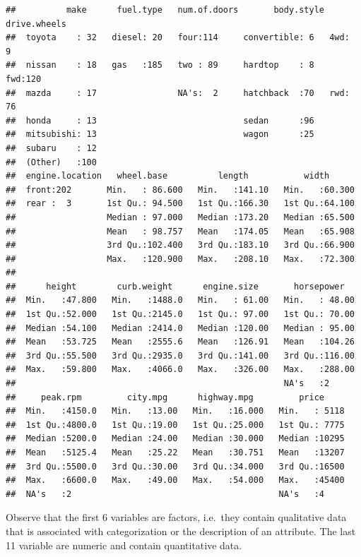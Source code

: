 \documentclass[]{krantz}
\theoremstyle{definition}
\theoremstyle{definition}
\theoremstyle{definition}
\theoremstyle{remark}
\begin{document}
\begin{verbatim}
##          make      fuel.type   num.of.doors       body.style drive.wheels
##  toyota    : 32   diesel: 20   four:114     convertible: 6   4wd:  9     
##  nissan    : 18   gas   :185   two : 89     hardtop    : 8   fwd:120     
##  mazda     : 17                NA's:  2     hatchback  :70   rwd: 76     
##  honda     : 13                             sedan      :96               
##  mitsubishi: 13                             wagon      :25               
##  subaru    : 12                                                          
##  (Other)   :100                                                          
##  engine.location   wheel.base          length           width       
##  front:202       Min.   : 86.600   Min.   :141.10   Min.   :60.300  
##  rear :  3       1st Qu.: 94.500   1st Qu.:166.30   1st Qu.:64.100  
##                  Median : 97.000   Median :173.20   Median :65.500  
##                  Mean   : 98.757   Mean   :174.05   Mean   :65.908  
##                  3rd Qu.:102.400   3rd Qu.:183.10   3rd Qu.:66.900  
##                  Max.   :120.900   Max.   :208.10   Max.   :72.300  
##                                                                     
##      height        curb.weight      engine.size       horsepower    
##  Min.   :47.800   Min.   :1488.0   Min.   : 61.00   Min.   : 48.00  
##  1st Qu.:52.000   1st Qu.:2145.0   1st Qu.: 97.00   1st Qu.: 70.00  
##  Median :54.100   Median :2414.0   Median :120.00   Median : 95.00  
##  Mean   :53.725   Mean   :2555.6   Mean   :126.91   Mean   :104.26  
##  3rd Qu.:55.500   3rd Qu.:2935.0   3rd Qu.:141.00   3rd Qu.:116.00  
##  Max.   :59.800   Max.   :4066.0   Max.   :326.00   Max.   :288.00  
##                                                     NA's   :2       
##     peak.rpm         city.mpg      highway.mpg         price      
##  Min.   :4150.0   Min.   :13.00   Min.   :16.000   Min.   : 5118  
##  1st Qu.:4800.0   1st Qu.:19.00   1st Qu.:25.000   1st Qu.: 7775  
##  Median :5200.0   Median :24.00   Median :30.000   Median :10295  
##  Mean   :5125.4   Mean   :25.22   Mean   :30.751   Mean   :13207  
##  3rd Qu.:5500.0   3rd Qu.:30.00   3rd Qu.:34.000   3rd Qu.:16500  
##  Max.   :6600.0   Max.   :49.00   Max.   :54.000   Max.   :45400  
##  NA's   :2                                         NA's   :4
\end{verbatim}

Observe that the first 6 variables are factors, i.e.~they contain
qualitative data that is associated with categorization or the
description of an attribute. The last 11 variable are numeric and
contain quantitative data.
\end{document}
